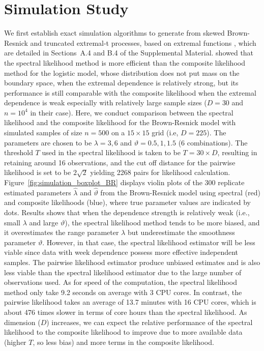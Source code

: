 \documentclass[12pt]{article}
\begin{document}
\section{Simulation Study} %
\label{sec:sim} %

We first establish exact simulation algorithms to generate from skewed Brown-Resnick and truncated extremal-t processes, based on extremal functions \citep{Dombry.Engelke.Oesting:2016}, which are detailed in Sections~A.4 and B.4 of the Supplemental Material. \citep{Huser.etal:2016} showed that the spectral likelihood method is more efficient than the composite likelihood method for the logistic model, whose distribution does not put mass on the boundary space, when the extremal dependence is relatively strong, but its performance is still comparable with the composite likelihood when the extremal dependence is weak especially with relatively large sample sizes ($D=30$ and $n=10^4$ in their case). Here, we conduct comparison between the spectral likelihood and the composite likelihood for the Brown-Resnick model with simulated samples of size $n=500$ on a $15\times15$ grid (i.e, $D=225$). The parameters are chosen to be $\lambda=3,6$ and $\vartheta=0.5,1,1.5$ (6 combinations). The threshold $T$ used in the spectral likelihood is taken to be $T=30\times D$, resulting in retaining around 16 observations, and the cut off distance for the pairwise likelihood is set to be $2\sqrt{2}$ yielding 2268 pairs for likelihood calculation. Figure~\ref{fig:simulation_boxplot_BR} displays violin plots of the 300 replicate estimated parameters $\hat\lambda$ and $\hat\vartheta$ from the Brown-Resnick model using spectral (red) and composite likelihoods (blue), where true parameter values are indicated by dots. Results shows that when the dependence strength is relatively weak (i.e., small $\lambda$ and large $\vartheta$), the spectral likelihood method tends to be more biased, and it overestimates the range parameter $\lambda$ but underestimate the smoothness parameter $\vartheta$. However, in that case, the spectral likelihood estimator will be less viable since data with week dependence possess more effective independent samples. The pairwise likelihood estimator produce unbiased estimates and is also less viable than the spectral likelihood estimator due to the large number of observations used. As for speed of the computation, the spectral likelihood method only take 9.2 seconds on average with 3 CPU cores. In contrast, the pairwise likelihood takes an average of 13.7 minutes with 16 CPU cores, which is about 476 times slower in terms of core hours than the spectral likelihood. As dimension ($D$) increases, we can expect the relative performance of the spectral likelihood to the composite likelihood to improve due to more available data (higher $T$, so less bias) and more terms in the composite likelihood.     
\end{document}
